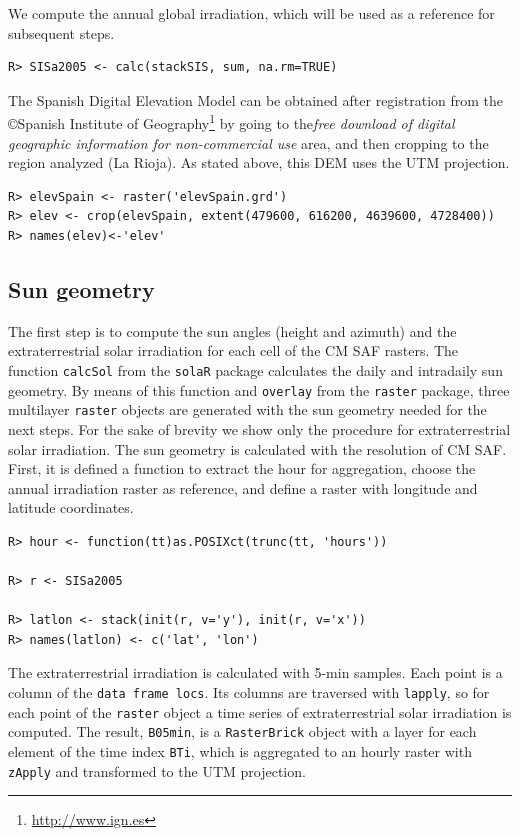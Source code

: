 \documentclass[11pt, english]{article}
\begin{document}
We compute the annual global irradiation, which will be used as a reference for subsequent steps.

\lstset{language=R,numbers=none}
\begin{lstlisting} 
R> SISa2005 <- calc(stackSIS, sum, na.rm=TRUE)
\end{lstlisting}

The Spanish Digital Elevation Model can be obtained after registration
from the \copyright Spanish Institute of
Geography\footnote{\url{http://www.ign.es}} by going to the\emph{free
  download of digital geographic information for non-commercial use}
area, and then cropping to the region analyzed (La Rioja). As stated
above, this DEM uses the UTM projection.

\lstset{language=R,numbers=none}
\begin{lstlisting} 
R> elevSpain <- raster('elevSpain.grd')
R> elev <- crop(elevSpain, extent(479600, 616200, 4639600, 4728400))
R> names(elev)<-'elev'
\end{lstlisting}

\subsection{Sun geometry}
\label{sec-1-3}

The first step is to compute the sun angles (height and azimuth) and
the extraterrestrial solar irradiation for each cell of the CM SAF
rasters. The function \texttt{calcSol} from the \texttt{solaR} package
calculates the daily and intradaily sun geometry. By means of this
function and \texttt{overlay} from the \texttt{raster} package, three
multilayer \texttt{raster} objects are generated with the sun geometry
needed for the next steps. For the sake of brevity we show only the
procedure for extraterrestrial solar irradiation. The sun geometry is
calculated with the resolution of CM SAF.  First, it is defined a
function to extract the hour for aggregation, choose the annual
irradiation raster as reference, and define a raster with longitude
and latitude coordinates.

\lstset{language=R,numbers=none}
\begin{lstlisting} 
R> hour <- function(tt)as.POSIXct(trunc(tt, 'hours'))

R> r <- SISa2005

R> latlon <- stack(init(r, v='y'), init(r, v='x'))
R> names(latlon) <- c('lat', 'lon')
\end{lstlisting}

The extraterrestrial irradiation is calculated with 5-min
samples. Each point is a column of the \texttt{data frame locs}. Its
columns are traversed with \texttt{lapply}, so for each point of the
\texttt{raster} object a time series of extraterrestrial solar
irradiation is computed. The result, \texttt{B05min}, is a
\texttt{RasterBrick} object with a layer for each element of the time
index \texttt{BTi}, which is aggregated to an hourly raster with
\texttt{zApply} and transformed to the UTM projection.
\end{document}
